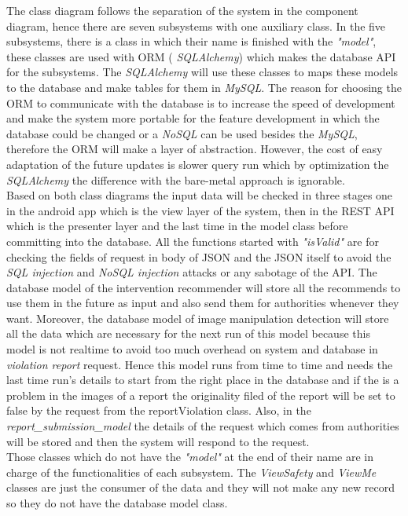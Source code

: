 The class diagram follows the separation of the system in the component diagram, hence there are seven subsystems with one auxiliary class. In the five subsystems, there is a class in which their name is finished with the  \emph{"model"}, these classes are used with ORM ( \emph{SQLAlchemy}) which makes the database API  for the subsystems. The  \emph{SQLAlchemy} will use these classes to maps these models to the database and make tables for them in  \emph{MySQL}. The reason for choosing the ORM to communicate with the database is to increase the speed of development and make the system more portable for the feature development in which the database could be changed or a  \emph{NoSQL} can be used besides the  \emph{MySQL}, therefore the ORM will make a layer of abstraction. However, the cost of easy adaptation of the future updates is slower query run which by optimization the  \emph{SQLAlchemy} the difference with the bare-metal approach is ignorable.\\
Based on both class diagrams the input data will be checked in three stages one in the android app which is the view layer of the system, then in the REST API which is the presenter layer and the last time in the model class before committing into the database. All the functions started with  \emph{"isValid"} are for checking the fields of request in body of JSON and the JSON itself to avoid the  \emph{SQL injection} and  \emph{NoSQL injection} attacks or any sabotage of the API. The database model of the intervention recommender will store all the recommends to use them in the future as input and also send them for authorities whenever they want. Moreover, the database model of image manipulation detection will store all the data which are necessary for the next run of this model because this model is not realtime to avoid too much overhead on system and database in  \emph{violation report} request. Hence this model runs from time to time and needs the last time run's details to start from the right place in the database and if the is a problem in the images of a report the originality filed of the report will be set to false by the request from the reportViolation class. Also, in the  \emph{report\_submission\_model} the details of the request which comes from authorities will be stored and then the system will respond to the request.\\
Those classes which do not have the  \emph{"model"} at the end of their name are in charge of the functionalities of each subsystem. The  \emph{ViewSafety} and  \emph{ViewMe} classes are just the consumer of the data and they will not make any new record so they do not have the database model class.\\
